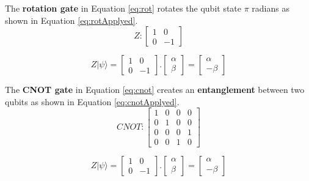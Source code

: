 			\par The \textbf{rotation gate} in Equation \ref{eq:rot} rotates the qubit state $\pi$ radians as shown in Equation \ref{eq:rotApplyed}.
			\begin{equation}
				\label{eq:rot}
				Z : 
				\begin{bmatrix}
					1& 0 \\
					0& -1
				\end{bmatrix}
			\end{equation}
			
			\begin{equation}
				\label{eq:rotApplyed}
				Z|\psi\rangle = \begin{bmatrix}
					1& 0 \\
					0& -1
				\end{bmatrix} . \begin{bmatrix}
					\alpha \\
					\beta
				\end{bmatrix} = \begin{bmatrix}
					\alpha \\
					-\beta
				\end{bmatrix}
			\end{equation}

			\par The \textbf{CNOT gate} in Equation \ref{eq:cnot} creates an \textbf{entanglement} between two qubits as shown in Equation \ref{eq:cnotApplyed}.
			\begin{equation}
				\label{eq:cnot}
				CNOT : 
				\begin{bmatrix}
					1& 0& 0& 0 \\
					0& 1& 0& 0 \\
					0& 0& 0& 1 \\
					0& 0& 1& 0
				\end{bmatrix}
			\end{equation}
			
			\begin{equation}
				\label{eq:cnotApplyed}
				Z|\psi\rangle = \begin{bmatrix}
					1& 0 \\
					0& -1
				\end{bmatrix} . \begin{bmatrix}
					\alpha \\
					\beta
				\end{bmatrix} = \begin{bmatrix}
					\alpha \\
					-\beta
				\end{bmatrix}
			\end{equation}


